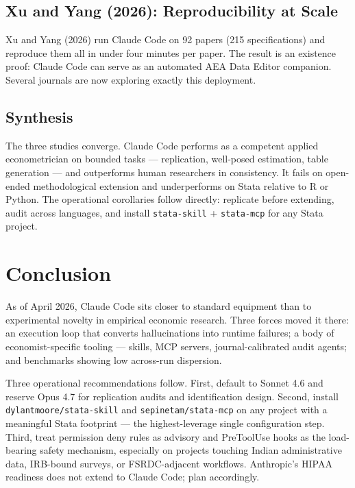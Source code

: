 \documentclass[11pt]{article}
\begin{document}
\subsection{Xu and Yang (2026): Reproducibility at Scale}

Xu and Yang (2026) run Claude Code on 92 papers (215 specifications) and reproduce them all in under four minutes per paper. The result is an existence proof: Claude Code can serve as an automated AEA Data Editor companion. Several journals are now exploring exactly this deployment.

\subsection{Synthesis}

The three studies converge. Claude Code performs as a competent applied econometrician on bounded tasks --- replication, well-posed estimation, table generation --- and outperforms human researchers in consistency. It fails on open-ended methodological extension and underperforms on Stata relative to R or Python. The operational corollaries follow directly: replicate before extending, audit across languages, and install \texttt{stata-skill} + \texttt{stata-mcp} for any Stata project.

\section{Conclusion}\label{sec:conclusion}

As of April 2026, Claude Code sits closer to standard equipment than to experimental novelty in empirical economic research. Three forces moved it there: an execution loop that converts hallucinations into runtime failures; a body of economist-specific tooling --- skills, MCP servers, journal-calibrated audit agents; and benchmarks showing low across-run dispersion.

Three operational recommendations follow. First, default to Sonnet 4.6 and reserve Opus 4.7 for replication audits and identification design. Second, install \texttt{dylantmoore/stata-skill} and \texttt{sepinetam/stata-mcp} on any project with a meaningful Stata footprint --- the highest-leverage single configuration step. Third, treat permission deny rules as advisory and PreToolUse hooks as the load-bearing safety mechanism, especially on projects touching Indian administrative data, IRB-bound surveys, or FSRDC-adjacent workflows. Anthropic's HIPAA readiness does not extend to Claude Code; plan accordingly.
\end{document}
